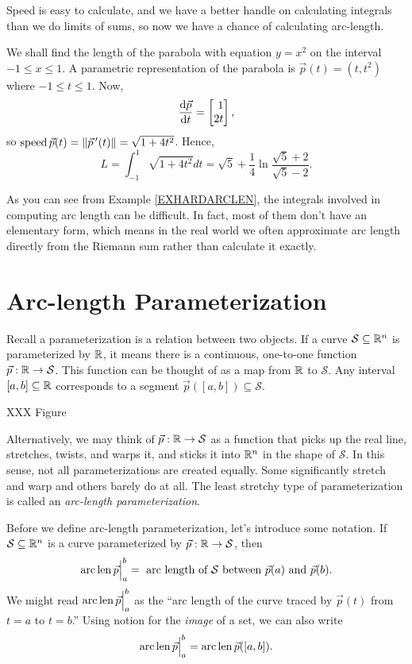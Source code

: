 Speed is easy to calculate, and we have a better handle on calculating integrals than we do 
limits of sums, so now we have a chance of calculating arc-length.

\begin{example}
	\label{EXHARDARCLEN}
We shall find the length of the parabola with equation $y = x^2$
on the interval $-1\le x \le 1$.   A parametric representation
	of the parabola is $\vec p(t) = (t,t^2)$
where $-1 \le t \le 1$.  
Now,
\[
	\frac{\d\vec p}{\d t} = \mat{1\\2t},
\]
so $\operatorname{speed} \vec p(t)=\lVert\vec p\,'(t)\rVert = \sqrt{ 1 + 4t^2}$.
Hence,
\[
  L = \int_{-1}^1 \sqrt{1 + 4t^2} dt = \sqrt 5 + 
\frac 14\ln\frac{\sqrt 5 + 2}{\sqrt 5 - 2}.
\]
\end{example}

As you can see from Example \ref{EXHARDARCLEN}, the integrals involved in computing
arc length can be difficult.  In fact, most of them don't have an elementary form, which
means in the real world we often approximate arc length directly from the Riemann sum
rather than calculate it exactly.

\begin{exercises}
\end{exercises}

\section{Arc-length Parameterization}

Recall a parameterization is a relation between two objects.  If a curve $\mathcal S\subseteq\mathbb{R}^n$
is parameterized by $\mathbb{R}$, it means there is a continuous, one-to-one function $\vec p:\mathbb{R}\to\mathcal S$.
This function can be thought of as a map from $\mathbb{R}$ to $\mathcal S$.  Any interval $[a,b]\subseteq\mathbb{R}$
corresponds to a segment $\vec p([a,b])\subseteq \mathcal S$.

XXX Figure

Alternatively, we may think of $\vec p:\mathbb{R}\to\mathcal S$ as a function that picks up the real line,
stretches, twists, and warps it, and sticks it into $\mathbb{R}^n$ in the shape of $\mathcal S$.
In this sense, not all parameterizations are created equally.  Some significantly stretch and warp
and others barely do at all.  The least stretchy type of parameterization is called an \emph{arc-length
parameterization}.

Before we define arc-length parameterization, let's introduce some notation.  If $\mathcal S\subseteq \mathbb{R}^n$
is a curve parameterized by $\vec p:\mathbb{R}\to\mathcal S$, then
\[
	\operatorname{arc\,len} \vec p \Big|_{a}^{b}  = \text{ arc length of $\mathcal S$ between $\vec p(a)$ and $\vec p(b)$}.
\]
We might read $\operatorname{arc\,len} \vec p \Big|_{a}^{b}$ as the ``arc length of the curve traced by $\vec p(t)$ from
$t=a$ to $t=b$.''  Using notion for the \emph{image} of a set, we can also write
\[
	\operatorname{arc\,len} \vec p \Big|_{a}^{b} = \operatorname{arc\,len} \vec p([a,b]).
\]

